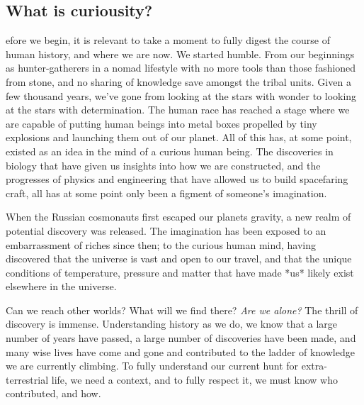 \subsection*{What is curiousity?}
efore we begin, it is relevant to take a moment to fully digest the course of human history, and where we are now.
We started humble.
From our beginnings as hunter-gatherers in a nomad lifestyle with no more tools than those fashioned from stone, and no sharing of knowledge save amongst the tribal units.
Given a few thousand years, we've gone from looking at the stars with wonder to looking at the stars with determination.
The human race has reached a stage where we are capable of putting human beings into metal boxes propelled by tiny explosions and launching them out of our planet.
All of this has, at some point, existed as an idea in the mind of a curious human being.
The discoveries in biology that have given us insights into how we are constructed, and the progresses of physics and engineering that have allowed us to build spacefaring craft, all has at some point only been a figment of someone's imagination.

When the Russian cosmonauts first escaped our planets gravity, a new realm of potential discovery was released.
The imagination has been exposed to an embarrassment of riches since then; to the curious human mind, having discovered that the universe is vast and open to our travel, and that the unique conditions of temperature, pressure and matter that have made *us* likely exist elsewhere in the universe.

Can we reach other worlds?
What will we find there?
\textit{Are we alone?}
The thrill of discovery is immense.
Understanding history as we do, we know that a large number of years have passed, a large number of discoveries have been made, and many wise lives have come and gone and contributed to the ladder of knowledge we are currently climbing.
To fully understand our current hunt for extra-terrestrial life, we need a context, and to fully respect it, we must know who contributed, and how.